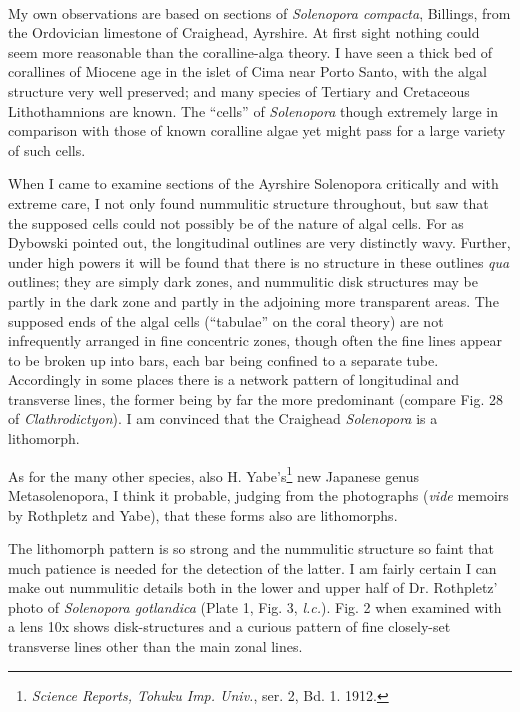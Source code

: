 \documentclass[a4paper, 12pt, oneside]{article}
\begin{document}
\paragraph{}
My own observations are based on sections of \emph{Solenopora compacta}, Billings, from the Ordovician limestone of Craighead, Ayrshire. At first sight nothing could seem more reasonable than the coralline-alga theory. I have seen a thick bed of corallines of Miocene age in the islet of Cima near Porto Santo, with the algal structure very well preserved; and many species of Tertiary and Cretaceous Lithothamnions are known. The ``cells'' of \emph{Solenopora} though extremely large in comparison with those of known coralline algae yet might pass for a large variety of such cells.

When I came to examine sections of the Ayrshire Solenopora critically and with extreme care, I not only found nummulitic structure throughout, but saw that the supposed cells could not possibly be of the nature of algal cells. For as Dybowski pointed out, the longitudinal outlines are very distinctly wavy. Further, under high powers it will be found that there is no structure in these outlines \emph{qua} outlines; they are simply dark zones, and nummulitic disk structures may be partly in the dark zone and partly in the adjoining more transparent areas. The supposed ends of the algal cells (``tabulae'' on the coral theory) are not infrequently arranged in fine concentric zones, though often the fine lines appear to be broken up into bars, each bar being confined to a separate tube. Accordingly in some places there is a network pattern of longitudinal and transverse lines, the former being by far the more predominant (compare Fig. 28 of \emph{Clathrodictyon}). I am convinced that the Craighead \emph{Solenopora} is a lithomorph.

As for the many other species, also H. Yabe's\footnote{\emph{Science Reports, Tohuku Imp. Univ.}, ser. 2, Bd. 1. 1912.} new Japanese genus Metasolenopora, I think it probable, judging from the photographs (\emph{vide} memoirs by Rothpletz and Yabe), that these forms also are lithomorphs.

The lithomorph pattern is so strong and the nummulitic structure so faint that much patience is needed for the detection of the latter. I am fairly certain I can make out nummulitic details both in the lower and upper half of Dr. Rothpletz' photo of \emph{Solenopora gotlandica} (Plate 1, Fig. 3, \emph{l.c.}). Fig. 2 when examined with a lens 10x shows disk-structures and a curious pattern of fine closely-set transverse lines other than the main zonal lines.
\end{document}
